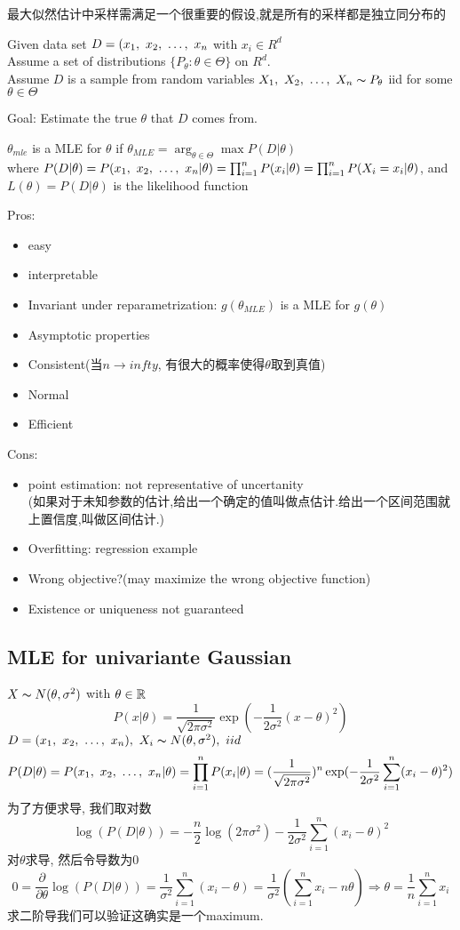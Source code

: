 \documentclass{article}
\begin{document}
最大似然估计中采样需满足一个很重要的假设,就是所有的采样都是独立同分布的

Given data set $D = (x_1,~x_2,~\ldots,~x_n$ with $x_i \in R^d$\\
Assume a set of distributions $\{ P_\theta: \theta \in \Theta \}$ on $R^d$.\\
Assume $D$ is a sample from random variables $X_1,~X_2,~\ldots,~X_n \thicksim{P}_\theta$ iid for some $\theta \in \Theta$

Goal: Estimate the true $\theta$ that $D$ comes from.
\begin{definition}
$\theta_{mle}$ is a MLE for $\theta$ if $\theta_{MLE} = \arg_{\theta \in \Theta} \max P(D|\theta)$ \\
where $P(D|\theta) = P(x_1,~x_2,~\ldots,~x_n | \theta) = \prod_{i = 1}^n P(x_i|\theta) = \prod_{i=1}^n P(X_i = x_i|\theta)$,
and $L(\theta) = P(D|\theta)$ is the likelihood function
\end{definition}

Pros:
\begin{itemize}
\item easy
\item interpretable
\item Invariant under reparametrization: $g(\theta_{MLE})$ is a MLE for $g(\theta)$
\item Asymptotic properties
\item Consistent(当$n \to infty$, 有很大的概率使得$\theta$取到真值)
\item Normal
\item Efficient
\end{itemize}

Cons:
\begin{itemize}
\item point estimation: not representative of uncertanity\\
(如果对于未知参数的估计,给出一个确定的值叫做点估计.给出一个区间范围就上置信度,叫做区间估计.)
\item Overfitting: regression example
\item Wrong objective?(may maximize the wrong objective function)
\item Existence or uniqueness not guaranteed
\end{itemize}

\subsection{MLE for univariante Gaussian}
$X \thicksim{N}(\theta, \sigma^2)$ with $\theta \in \mathbb{R}$
$$P(x|\theta) = \dfrac{1}{\sqrt{2\pi \sigma^2}} \exp(-\dfrac{1}{2\sigma^2}(x-\theta)^2)$$
$D = (x_1,~x_2,~\ldots,~x_n),\ X_i \thicksim{N}(\theta, \sigma^2),\ iid$
$$
P(D|\theta)
= P(x_1,~x_2,~\ldots,~x_n| \theta)
= \prod_{i=1}^n P(x_i|\theta)
= (\dfrac{1}{\sqrt{2\pi \sigma^2}})^n \exp(-\dfrac{1}{2\sigma^2} \sum_{i=1}^n (x_i -\theta)^2)
$$
为了方便求导, 我们取对数
$$
\log(P(D|\theta)) = -\dfrac{n}{2} \log(2 \pi \sigma^2) - \dfrac{1}{2\sigma^2} \sum_{i=1}^n (x_i - \theta)^2
$$
对$\theta$求导, 然后令导数为$0$
$$
0 = \dfrac{\partial }{\partial \theta} \log(P(D|\theta))
= \dfrac{1}{\sigma^2} \sum_{i=1}^n (x_i - \theta)
= \dfrac{1}{\sigma^2} (\sum_{i=1}^n x_i - n \theta)
\Rightarrow \theta = \dfrac{1}{n} \sum_{i=1}^n x_i
$$
求二阶导我们可以验证这确实是一个maximum.
\end{document}
